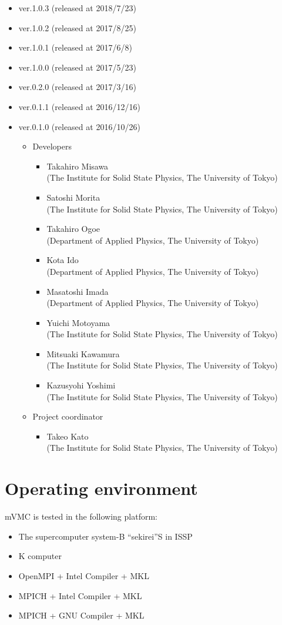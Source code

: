 \begin{itemize}
\item{ver.1.0.3 (released at 2018/7/23)}
\item{ver.1.0.2 (released at 2017/8/25)}
\item{ver.1.0.1 (released at 2017/6/8)}
\item{ver.1.0.0 (released at 2017/5/23)}
\item{ver.0.2.0 (released at 2017/3/16)}
\item{ver.0.1.1 (released at 2016/12/16)}
\item{ver.0.1.0 (released at 2016/10/26)}
\begin{itemize}
\item{Developers}
	\begin{itemize}
	\item{Takahiro Misawa \\(The Institute for Solid State Physics, The University of Tokyo)}
	\item{Satoshi Morita \\(The Institute for Solid State Physics, The University of Tokyo)}
	\item{Takahiro Ogoe \\(Department of Applied Physics, The University of Tokyo)}
	\item{Kota Ido \\(Department of Applied Physics, The University of Tokyo)}
	\item{Masatoshi Imada \\(Department of Applied Physics, The University of Tokyo)}
	\item{Yuichi Motoyama \\(The Institute for Solid State Physics, The University of Tokyo)}
	\item{Mitsuaki Kawamura \\(The Institute for Solid State Physics, The University of Tokyo)}
	\item{Kazusyohi Yoshimi \\(The Institute for Solid State Physics, The University of Tokyo)}
	\end{itemize}

\item{Project coordinator}
	\begin{itemize}
	\item{Takeo Kato \\(The Institute for Solid State Physics, The University of Tokyo)}
	\end{itemize}

\end{itemize}

\end{itemize}


\section{Operating environment}
mVMC is tested in the following platform:
\begin{itemize}
\item The supercomputer system-B ``sekirei''S in ISSP
\item K computer
\item OpenMPI + Intel Compiler + MKL
\item MPICH + Intel Compiler + MKL
\item MPICH + GNU Compiler + MKL
\end{itemize}
